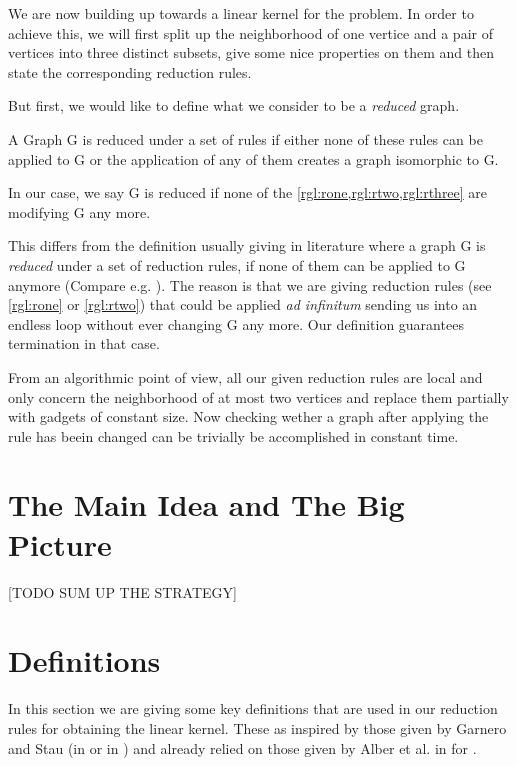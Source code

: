 We are now building up towards a linear kernel for the \sdom problem. In order to achieve this, we will first split up the neighborhood of one vertice and a pair of vertices into three distinct subsets, give some nice properties on them and then state the corresponding reduction rules.  



But first, we would like to define what we consider to be a \textit{reduced} graph. 

\begin{definition}
    A Graph G is reduced under a set of rules if either none of these rules can be applied to G or the application of any of them creates a graph isomorphic to G.
\end{definition}\label{def:reduced}

In our case, we say G is reduced if none of the \cref{rgl:rone,rgl:rtwo,rgl:rthree} are modifying G any more.

This differs from the definition usually giving in literature where a graph G is \textit{reduced} under a set of reduction rules, if none of them can be applied to G anymore (Compare e.g. \cite{Fomin2019}). The reason is that we are giving reduction rules (see \cref{rgl:rone} or \cref{rgl:rtwo}) that could be applied \textit{ad infinitum} sending us into an endless loop without ever changing G any more. Our definition guarantees termination in that case.

From an algorithmic point of view, all our given reduction rules are local and only concern the neighborhood of at most two vertices and replace them partially with gadgets of constant size. Now checking wether a graph after applying the rule has beein changed can be trivially be accomplished in constant time.

\section{The Main Idea and The Big Picture}

[TODO SUM UP THE STRATEGY]


\section{Definitions}

In this section we are giving some key definitions that are used in our reduction rules for obtaining the linear kernel. These as inspired by those given by Garnero and Stau (\ptdom in \cite[]{Garnero2014} or \prbdom in \cite{Garnero2017a}) and already relied on those given by Alber et al. in \cite[]{Alber2004} for \pdom.

